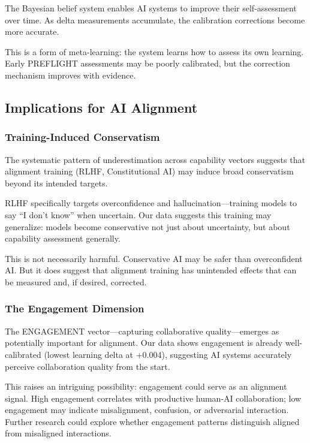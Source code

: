 The Bayesian belief system enables AI systems to improve their self-assessment over time. As delta measurements accumulate, the calibration corrections become more accurate.

This is a form of meta-learning: the system learns how to assess its own learning. Early PREFLIGHT assessments may be poorly calibrated, but the correction mechanism improves with evidence.

\subsection{Implications for AI Alignment}

\subsubsection{Training-Induced Conservatism}

The systematic pattern of underestimation across capability vectors suggests that alignment training (RLHF, Constitutional AI) may induce broad conservatism beyond its intended targets.

RLHF specifically targets overconfidence and hallucination---training models to say ``I don't know'' when uncertain. Our data suggests this training may generalize: models become conservative not just about uncertainty, but about capability assessment generally.

This is not necessarily harmful. Conservative AI may be safer than overconfident AI. But it does suggest that alignment training has unintended effects that can be measured and, if desired, corrected.

\subsubsection{The Engagement Dimension}

The ENGAGEMENT vector---capturing collaborative quality---emerges as potentially important for alignment. Our data shows engagement is already well-calibrated (lowest learning delta at +0.004), suggesting AI systems accurately perceive collaboration quality from the start.

This raises an intriguing possibility: engagement could serve as an alignment signal. High engagement correlates with productive human-AI collaboration; low engagement may indicate misalignment, confusion, or adversarial interaction. Further research could explore whether engagement patterns distinguish aligned from misaligned interactions.

